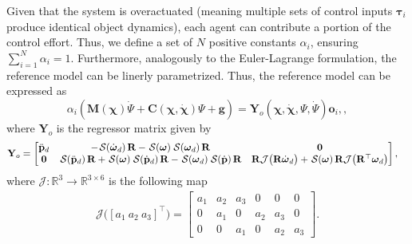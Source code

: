 Given that the system is overactuated (meaning multiple sets of control inputs $\boldsymbol{\tau}_i$ produce identical object dynamics), each agent can contribute a portion of the control effort. Thus, we define a set of $N$ positive constants $\alpha_i$, ensuring $\sum_{i=1}^N\alpha_i=1$. Furthermore, analogously to the Euler-Lagrange formulation, the reference model can be linerly parametrized. Thus, the reference model can be expressed as 
\begin{equation}
    \alpha _i \left(\mathbf {M}(\boldsymbol{\chi})\dot{\Psi} + \mathbf {C}(\boldsymbol{\chi},\dot{\boldsymbol{\chi}})\Psi + \mathbf {g} \right) = \mathbf{Y}_o(\boldsymbol{\chi}, \dot{\boldsymbol{\chi}}, \Psi, \dot{\Psi})\mathbf{o}_i, \label{eq:ref-model-linear-parametrization},
\end{equation}
where $\mathbf{Y}_o$ is the regressor matrix given by
\begin{align}
    \mathbf{Y}_o &= \begin{bmatrix}
        \ddot{\mathbf{p}}_d & -\SL[\dot{\boldsymbol{\omega}}_d]\mathbf{R}-\SL[\boldsymbol{\omega}]\SL[\boldsymbol{\omega}_d]\mathbf{R} & \mathbf{0}\\
        \mathbf{0} & \SL[\ddot{\mathbf{p}}_d]\mathbf{R} + \SL[\boldsymbol{\omega}]\SL[\dot{\mathbf{p}}_d]\mathbf{R} - \SL[\boldsymbol{\omega}_d]\SL[\dot{\mathbf{p}}]\mathbf{R} & \mathbf{R}\mathcal{J}\bigl(\mathbf{R}\dot{\boldsymbol{\omega}}_d\bigr) + \SL[\boldsymbol{\omega}]\mathbf{R}\mathcal{J}\bigl(\mathbf{R}^\top\boldsymbol{\omega}_d\bigr)
    \end{bmatrix},
\end{align}
where $\mathcal{J}:\mathbb{R}^3\to\mathbb{R}^{3\times6}$ is the following map
\begin{align}
    \mathcal{J}\bigl([a_1\ a_2\ a_3]^\top\bigr)=\begin{bmatrix}
        a_1 & a_2 & a_3 & 0 & 0 & 0 \\
        0 & a_1 & 0 & a_2 & a_3 & 0 \\
        0 & 0 & a_1 & 0 & a_2 & a_3
    \end{bmatrix}.
\end{align}
